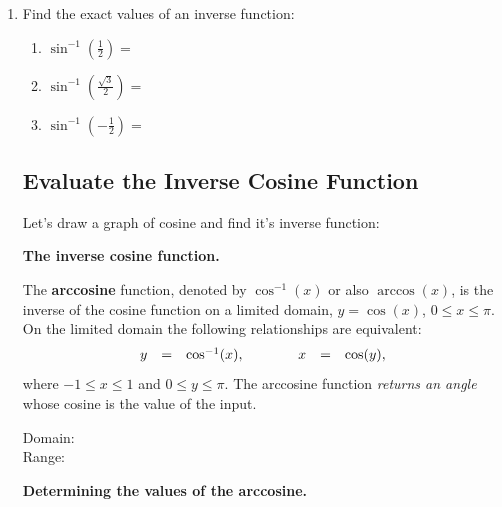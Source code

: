 \begin{enumerate}
\vspace{-.1in}
\item Find the exact values of an inverse function:

\begin{enumerate} 
\item $\displaystyle \sin^{-1}\left(\frac{1}{2}\right)=$\\[10pt]

\item $\displaystyle \sin^{-1}\left(\frac{\sqrt{3}}{2}\right)=$\\[10pt]

\item $\displaystyle \sin^{-1}\left(-\frac{1}{2}\right)=$\\[10pt]
\end{enumerate}



\subsection{Evaluate the Inverse Cosine Function}

Let's draw a graph of cosine and find it's inverse function:
\vfill

   \noindent\colorbox{blue!10}{%
   \parbox{\dimexpr\linewidth}%
   {%
     \textbf{The inverse cosine function.}

     The \textbf{arccosine} function, denoted by $\cos^{-1}(x)$ or
     also $\arccos(x)$, is the inverse of the cosine function on a
     limited domain, $y=\cos(x)$, $0 \leq x \leq \pi$. On the limited
     domain the following relationships are equivalent:
     \begin{eqnarray*}
       \begin{array}{rcl@{\hspace{4em}}rcl}
         y & = & \cos^{-1}(x), & x & = & \cos(y),
       \end{array}
     \end{eqnarray*}
     where $-1 \leq x \leq 1$ and $0 \leq y \leq \pi$. The arccosine
     function \textit{returns an angle} whose cosine is the value of
     the input.

     }
 }


\noindent Domain:\\
\noindent Range:

\clearpage

   \noindent\colorbox{blue!10}{%
   \parbox{\dimexpr\linewidth}%
   {%
     \textbf{Determining the values of the arccosine.}

}}
\end{enumerate}
